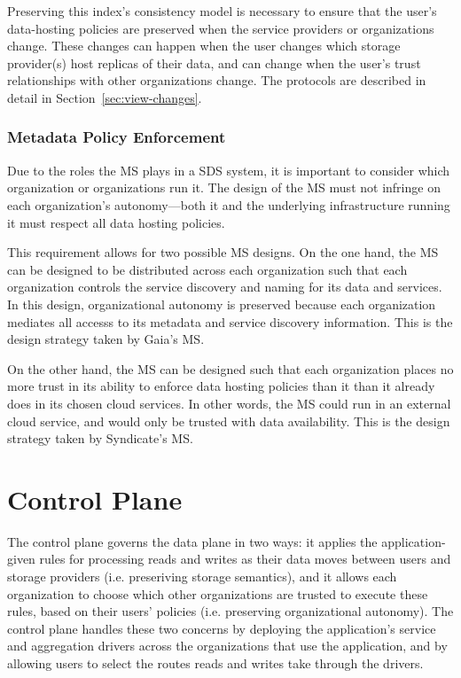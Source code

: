 Preserving this index's consistency model is necessary to ensure that the user's
data-hosting policies are preserved when the service providers or organizations
change.  These changes can happen when the user changes which storage
provider(s) host replicas of their data, and can change when the user's trust
relationships with other organizations change.  The protocols are described in
detail in Section~\ref{sec:view-changes}.


\subsubsection{Metadata Policy Enforcement}

Due to the roles the MS plays in a SDS system, it is important to consider
which organization or organizations run it.  The design of the MS must not infringe on
each organization's autonomy---both it and the underlying infrastructure
running it must respect all data hosting policies.

This requirement allows for two possible MS designs.  On the one hand,
the MS can be designed to be distributed across each organization such that each
organization controls the service discovery and naming for its data and
services.  In this design, organizational autonomy is preserved because each
organization mediates all accesss to its metadata and service discovery
information.  This is the design strategy taken by
Gaia's MS.

On the other hand, the MS can be designed such that each organization
places no more trust in its ability to enforce data hosting policies
than it than it already does in its chosen cloud services.  In other words, the
MS could run in an external cloud service, and would only be trusted
with data availability.  This is the design strategy taken by Syndicate's MS.

\section{Control Plane}

The control plane governs the data plane in two ways:  it applies
the application-given rules for processing reads and writes as their data moves
between users and storage providers (i.e. preseriving storage semantics),
and it allows each organization to choose which other organizations
are trusted to execute these rules, based on their users' policies
(i.e. preserving organizational autonomy).
The control plane handles these two concerns by deploying the application's
service and aggregation drivers across the organizations that use the
application, and by allowing users
to select the routes reads and writes take through the drivers.

